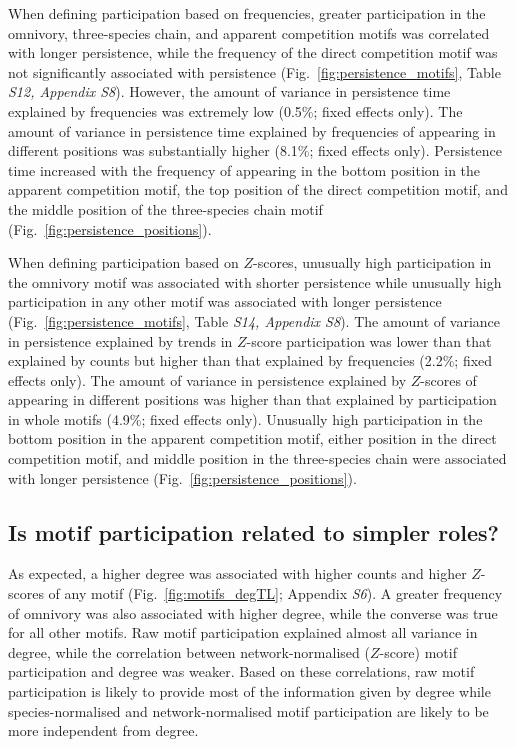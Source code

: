 \documentclass[12pt]{article}
\begin{document}
\begin{spacing}{2.0}
        
        When defining participation based on frequencies, greater participation in the omnivory, three-species chain, and apparent competition motifs was correlated with longer persistence, while the frequency of the direct competition motif was not significantly associated with persistence (Fig.~\ref{fig:persistence_motifs}, Table \emph{S12, Appendix S8}).
        However, the amount of variance in persistence time explained by frequencies was extremely low (0.5\%; fixed effects only). 
        The amount of variance in persistence time explained by frequencies of appearing in different positions was substantially higher (8.1\%; fixed effects only).
        Persistence time increased with the frequency of appearing in the bottom position in the apparent competition motif, the top position of the direct competition motif, and the middle position of the three-species chain motif (Fig.~\ref{fig:persistence_positions}).

        
        When defining participation based on $Z$-scores, unusually high participation in the omnivory motif was associated with shorter persistence while unusually high participation in any other motif was associated with longer persistence (Fig.~\ref{fig:persistence_motifs}, Table \emph{S14, Appendix S8}).
        The amount of variance in persistence explained by trends in $Z$-score participation was lower than that explained by counts but higher than that explained by frequencies (2.2\%; fixed effects only).
        The amount of variance in persistence explained by $Z$-scores of appearing in different positions was higher than that explained by participation in whole motifs (4.9\%; fixed effects only).
        Unusually high participation in the bottom position in the apparent competition motif, either position in the direct competition motif, and middle position in the three-species chain were associated with longer persistence (Fig.~\ref{fig:persistence_positions}).


    \subsection*{Is motif participation related to simpler roles?}    
    
        As expected, a higher degree was associated with higher counts and higher $Z$-scores of any motif (Fig.~\ref{fig:motifs_degTL}; Appendix \emph{S6}).
        A greater frequency of omnivory was also associated with higher degree, while the converse was true for all other motifs.
        Raw motif participation explained almost all variance in degree, while the correlation between network-normalised ($Z$-score) motif participation and degree was weaker.
        Based on these correlations, raw motif participation is likely to provide most of the information given by degree while species-normalised and network-normalised motif participation are likely to be more independent from degree.
        

\end{spacing}
\end{document}
